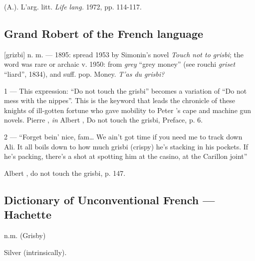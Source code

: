   (A.). L'arg. litt. \emph{Life lang.} 1972, pp. 114-117.

\subsection*{Grand Robert of the French language}

[grizbi] n. m. --- 1895: spread 1953 by Simonin's novel \emph{Touch not to grisbi}; the word was rare or archaic v. 1950: from \emph{grey} ``grey money'' (see rouchi \emph{griset} ``liard'', 1834), and suff. pop.  Money. \emph{T'as du grisbi?}

1 --- This expression: ``Do not touch the grisbi'' becomes a variation of ``Do not mess with the nippes''. This is the keyword that leads the chronicle of these knights of ill-gotten fortune who gave mobility to Peter 's cape and machine gun novels.
Pierre , \emph{in} Albert , Do not touch the grisbi, Preface, p. 6.

2 --- ``Forget bein' nice, fam\dots{} We ain't got time if you need me to track down Ali. It all boils down to how much grisbi (crispy) he's stacking in his pockets. If he’s packing, there’s a shot at spotting him at the casino, at the Carillon joint''

Albert , do not touch the grisbi, p. 147.

\subsection*{Dictionary of Unconventional French --- Hachette}

n.m. (Grisby)

Silver (intrinsically).


